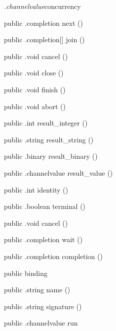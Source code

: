 \begin{CrexxClass}{\textit{.channelvalue}}{concurrency}
\begin{Members}
    \Method
      {public}
      {.completion}
      {next}
      {()}

    \Method
      {public}
      {.completion[]}
      {join}
      {()}

    \Method
      {public}
      {.void}
      {cancel}
      {()}

    \Method
      {public}
      {.void}
      {close}
      {()}

    \Method
      {public}
      {.void}
      {finish}
      {()}

    \Method
      {public}
      {.void}
      {abort}
      {()}

    \Method
      {public}
      {.int}
      {result\_integer}
      {()}

    \Method
      {public}
      {.string}
      {result\_string}
      {()}

    \Method
      {public}
      {.binary}
      {result\_binary}
      {()}

    \Method
      {public}
      {.channelvalue}
      {result\_value}
      {()}

    \Method
      {public}
      {.int}
      {identity}
      {()}

    \Method
      {public}
      {.boolean}
      {terminal}
      {()}

    \Method
      {public}
      {.void}
      {cancel}
      {()}

    \Method
      {public}
      {.completion}
      {wait}
      {()}

    \Method
      {public}
      {.completion}
      {completion}
      {()}

    \Factory
      {public}
      {binding}
      {}

    \Method
      {public}
      {.string}
      {name}
      {()}

    \Method
      {public}
      {.string}
      {signature}
      {()}

    \Method
      {public}
      {.channelvalue}
      {run}
      {}


\end{Members}
\end{CrexxClass}
